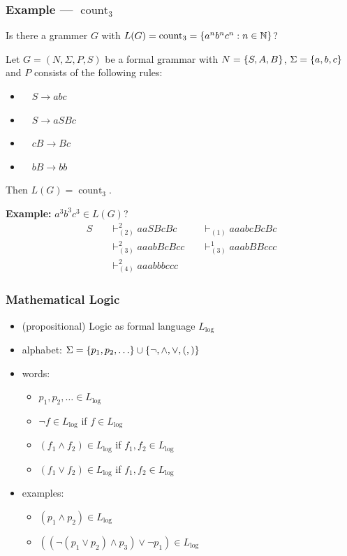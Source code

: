 \documentclass{beamer}
\DeclareMathOperator{\countL}{count}
\begin{document}
	\begin{frame} \frametitle{Example --- $\countL_3$}
		Is there a grammer $G$ with $L(G) = \countL_3 = \menge{a^n b^n c^n : n \in \N}$?
		
		\begin{theorem}
			Let $G = (N, \Sigma, P, S)$ be a formal grammar with $N = \left\{ S,A,B \right\}$, $\Sigma = \left\{ a,b,c \right\}$ and $P$ consists of the following rules: 		
			\begin{multicols}{3}
				\begin{itemize}
					\item {} $\quad S \to abc$ 
					\item {} $\quad S \to aSBc$
					\item {} $\quad cB \to Bc$
					\item {} $\quad bB \to bb$
				\end{itemize}
			\end{multicols}
			Then $L(G) = \countL_3$.
		\end{theorem}
		\textbf{Example:} $a^3 b^3 c^3 \in L(G)$?
		\begin{alignat*}{2}
		S \quad &\vdash^2_{(2)} aaSBcBc \quad &\vdash_{(1)} aaabcBcBc \\
		&\vdash_{(3)}^2 aaabBcBcc \quad &\vdash_{(3)}^1 aaabBBccc \\
		&\vdash_{(4)}^2 aaabbbccc
		\end{alignat*}
	\end{frame}

	\begin{frame} \frametitle{Mathematical Logic}
		\begin{itemize}
			\item (propositional) Logic as formal language $L_{\log}$
			\item alphabet: $\Sigma = \menge{p_1, p_2, \dots} \cup \menge{\lnot, \land, \lor, (,)}$
			\item words: 
			\begin{itemize}
				\item $p_1, p_2, \dots \in L_{\log}$
				\item $\lnot f \in L_{\log}$ if $f \in L_{\log}$
				\item $(f_1 \land f_2) \in L_{\log}$ if $f_1, f_2 \in L_{\log}$
				\item $(f_1 \lor f_2) \in L_{\log}$ if $f_1, f_2 \in L_{\log}$
			\end{itemize}
			\item examples:
			\begin{itemize}
				\item $(p_1 \land p_2) \in L_{\log}$
				\item $((\lnot (p_1 \lor p_2) \land p_3) \lor \lnot p_1) \in L_{\log}$
			\end{itemize}
		\end{itemize}
	\end{frame}
	
\end{document}
